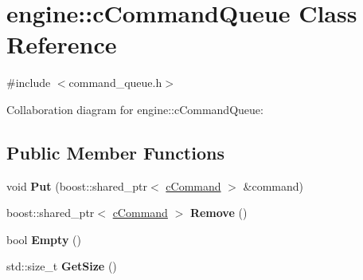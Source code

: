 \hypertarget{classengine_1_1cCommandQueue}{\section{engine\-:\-:c\-Command\-Queue Class Reference}
\label{classengine_1_1cCommandQueue}
}


{\ttfamily \#include $<$command\-\_\-queue.\-h$>$}



Collaboration diagram for engine\-:\-:c\-Command\-Queue\-:
\subsection*{Public Member Functions}
\begin{DoxyCompactItemize}
\item 
\hypertarget{classengine_1_1cCommandQueue_a2e7c11da33e9d8f35bcfa78fe684d2e4}{void {\bfseries Put} (boost\-::shared\-\_\-ptr$<$ \hyperlink{classengine_1_1cCommand}{c\-Command} $>$ \&command)}\label{classengine_1_1cCommandQueue_a2e7c11da33e9d8f35bcfa78fe684d2e4}

\item 
\hypertarget{classengine_1_1cCommandQueue_ae868e6227a60664fdc0d04346dd625e2}{boost\-::shared\-\_\-ptr$<$ \hyperlink{classengine_1_1cCommand}{c\-Command} $>$ {\bfseries Remove} ()}\label{classengine_1_1cCommandQueue_ae868e6227a60664fdc0d04346dd625e2}

\item 
\hypertarget{classengine_1_1cCommandQueue_a727d36f68de37caba84869e3f973ccbc}{bool {\bfseries Empty} ()}\label{classengine_1_1cCommandQueue_a727d36f68de37caba84869e3f973ccbc}

\item 
\hypertarget{classengine_1_1cCommandQueue_af6b95fb876418671d6285ee368abca25}{std\-::size\-\_\-t {\bfseries Get\-Size} ()}\label{classengine_1_1cCommandQueue_af6b95fb876418671d6285ee368abca25}

\end{DoxyCompactItemize}
